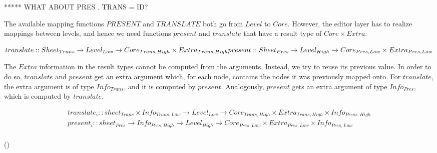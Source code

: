 ***** WHAT ABOUT PRES . TRANS = ID?

The available mapping functions $PRESENT$ and $TRANSLATE$ both go from $Level$ to $Core$. However, the editor layer has to realize mappings between levels, and hence we need functions $present$ and $translate$ that have a result type of $Core \times Extra$:

\begin{math}
translate :: Sheet_{Trans} \rightarrow Level_{Low} \rightarrow Core_{Trans,High}  \times Extra_{Trans,High} \\
present :: Sheet_{Pres} \rightarrow Level_{High} \rightarrow Core_{Pres,Low} \times Extra_{Pres,Low} \\
\end{math}

The $Extra$ information in the result types cannot be computed from the arguments. Instead, we try to reuse its previous value. In order to do so, $translate$ and $present$ get an extra argument which, for each node, contains the nodes it was previously mapped onto. For $translate$, the extra argument is of type $Info_{Trans}$, and it is computed by $present$. Analogously, $present$ gets an extra argument of type $Info_{Pres}$, which is computed by $translate$. 

\begin{small}\begin{align*}
translate_{i} :: sheet_{Trans} \times Info_{Trans,Low} \rightarrow Level_{Low} \rightarrow Core_{Trans,High}  \times Extra_{Trans,High}  \times Info_{Press,High}\\
present_{i} :: sheet_{Pres}  \rightarrow Info_{Pres,High} \rightarrow  Level_{High} \rightarrow Core_{Pres,Low} \times Extra_{Pres,Low}   \times Info_{Pres,Low} \\
\end{align*} 
\end{small}
{\centering ()\\}


